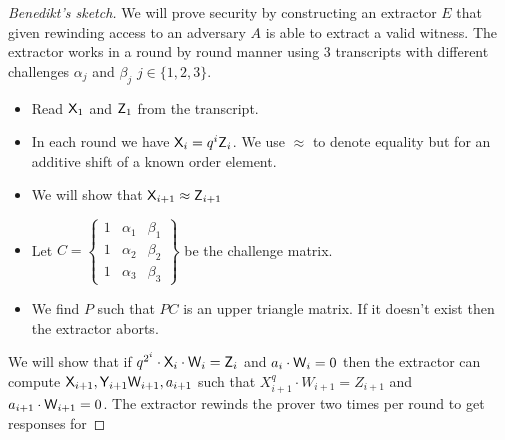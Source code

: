 \documentclass[12pt]{article}
\theoremstyle{Definition}
\begin{document}
	
	
	\begin{proof}[Benedikt's sketch]
	We will prove security by constructing an extractor $E$ that given rewinding access to an adversary $A$ is able to extract a valid witness. 
The extractor works in a round by round manner using $3$ transcripts with different challenges $\alpha_j$ and $\beta_j$ $j\in\{1,2,3\}$. 
 
\begin{itemize}
	\item Read $\mathsf{X}_1$ and $\mathsf{Z}_1$ from the transcript.
	\item In each round we have $\mathsf{X}_i = q^i \mathsf{Z}_i$. We use $\approx$ to denote equality but for an additive shift of a known order element.
	\item We will show that $\mathsf{X}_{i+1}\approx \mathsf{Z}_{i+1}$
	\item Let $C= \left\{\begin{array}{lll}
		1 & \alpha_1 & \beta_1\\
		1 & \alpha_2 & \beta_2\\
		1 & \alpha_3 & \beta_3
	\end{array}\right\} $ be the challenge matrix. 
	\item We find $P$ such that $P C$ is an upper triangle matrix. If it doesn't exist then the extractor aborts.
\end{itemize}
	We will show that if $q^{2^i}\cdot \mathsf{X}_i \cdot \mathsf{W}_i=\mathsf{Z}_i$ and $a_i \cdot \mathsf{W}_i=0$ then the extractor can compute $\mathsf{X}_{i+1},\mathsf{Y}_{i+1} \mathsf{W}_{i+1}, a_{i+1}$ such that $X_{i+1}^q\cdot W_{i+1}=Z_{i+1}$ and $a_{i+1}\cdot \mathsf{W}_{i+1}=0$.  
	The extractor rewinds the prover two times per round to get responses for  
	\end{proof}
	
\end{document}
